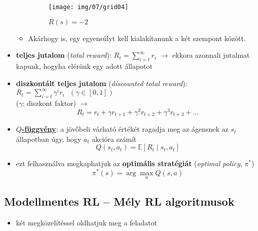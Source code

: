 \documentclass[a4paper, 11pt]{article}
\begin{document}
\begin{itemize}
\begin{itemize}
\begin{figure}[h!]
			\texttt{[image: img/07/grid04]}
			\caption{$R(s) = -2$}
		\end{figure}
		\item Akárhogy is, egy egyensúlyt kell kialakítanunk a két szempont között.
	\end{itemize}
	\pagebreak
	\item \textbf{teljes jutalom} (\textit{total reward}): $R_t = \sum\limits_{i = t}^\infty r_i$ $\to$ ekkora azonnali jutalmat kapunk, hogyha elérünk egy adott állapotot
	\item \textbf{diszkontált teljes jutalom} (\textit{discounted total reward}): $R_t = \sum\limits_{i = t}^\infty \gamma^i r_i ~~~ (\gamma \in [0,1])$ \\ ($\gamma$: diszkont faktor) $\to$ 
	\[ R_t = r_t + \gamma r_{t+1} + \gamma^2 r_{t+2} + \gamma^3 r_{t+3} + \dots \]
	\item \underline{\textbf{$Q$-függvény}}: a jövőbeli várható értékét ragadja meg az ágensnek az $s_t$ állapotban úgy, hogy $a_t$ akcióra számít
	\[ Q(s_t,a_t) = \mathbb{E}[R_t \mid s_t, a_t] \]
	\item ezt felhasználva megkaphatjuk az \textbf{optimális stratégiát} (\textit{optimal policy}, $\pi^{*}$)
	\[ \pi^*(s) = \arg \max_a Q(s, a) \]
\end{itemize}

\subsection{Modellmentes RL -- Mély RL algoritmusok}

\begin{itemize}
	\item két megközelítéssel oldhatjuk meg a feladatot
\end{itemize}
\end{document}
